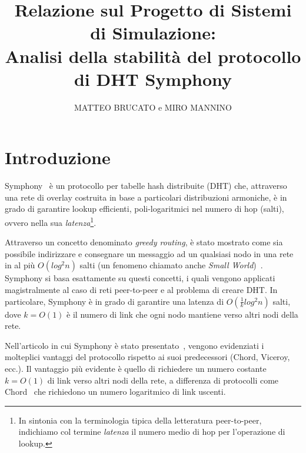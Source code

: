 \documentclass[prodmode,acmtap]{acmlarge}
\title{Relazione sul Progetto di Sistemi di Simulazione:\\Analisi della stabilità del protocollo di DHT Symphony}
\author{MATTEO BRUCATO e MIRO MANNINO\affil{Università di Bologna}
}
\begin{document}


\maketitle


\section{Introduzione}

Symphony~\cite{symphony} è un protocollo per tabelle hash distribuite (DHT) che, attraverso una rete di overlay costruita in base a particolari distribuzioni armoniche, è in grado di garantire lookup efficienti, poli-logaritmici nel numero di hop (salti), ovvero nella sua \emph{latenza}\footnote{In sintonia con la terminologia tipica della letteratura peer-to-peer, indichiamo col termine \emph{latenza} il numero medio di hop per l'operazione di lookup.}.

Attraverso un concetto denominato \emph{greedy routing}, è stato mostrato come sia possibile indirizzare e consegnare un messaggio ad un qualsiasi nodo in una rete in al più $O(log^2 n)$ salti (un fenomeno chiamato anche \emph{Small World})~\cite{small-world}. Symphony si basa esattamente su questi concetti, i quali vengono applicati magistralmente al caso di reti peer-to-peer e al problema di creare DHT. In particolare, Symphony è in grado di garantire una latenza di $O(\frac{1}{k} log^2 n)$ salti, dove $k=O(1)$ è il numero di link che ogni nodo mantiene verso altri nodi della rete.

Nell'articolo in cui Symphony è stato presentato~\cite{symphony}, vengono evidenziati i molteplici vantaggi del protocollo rispetto ai suoi predecessori (Chord, Viceroy, ecc.). Il vantaggio più evidente è quello di richiedere un numero costante $k=O(1)$ di link verso altri nodi della rete, a differenza di protocolli come Chord~\cite{chord} che richiedono un numero logaritmico di link uscenti.
\end{document}
